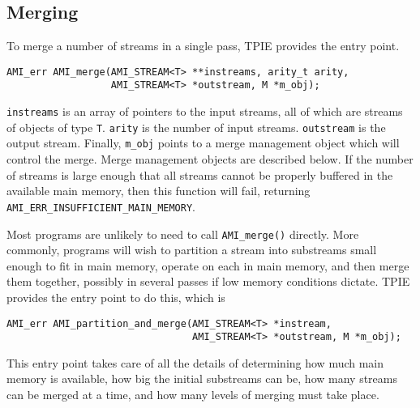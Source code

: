 \subsection{Merging}
\label{sec:ref-ami-merge}

To merge a number of streams in a single pass,
TPIE provides the entry point.

\begin{verbatim}
AMI_err AMI_merge(AMI_STREAM<T> **instreams, arity_t arity,
                  AMI_STREAM<T> *outstream, M *m_obj);
\end{verbatim}

\verb|instreams| is an array of pointers to the input streams, all of which
are streams of objects of type \verb|T|. \verb|arity| is the number of
input streams. \verb|outstream| is the output stream.  Finally,
\verb|m_obj| points to a merge management object which will control the
merge. Merge management objects are described below. If the number of
streams is large enough that all streams cannot be properly buffered in the
available main memory, then this function will fail, returning
\verb|AMI_ERR_INSUFFICIENT_MAIN_MEMORY|.

Most programs are unlikely to need to call \verb|AMI_merge()|
directly. More commonly, programs will wish to
partition a stream into substreams small enough to fit in main memory,
operate on each in main memory, and then merge them together, possibly in
several passes if low memory conditions dictate. TPIE provides the entry
point to do this, which is
\begin{verbatim}
AMI_err AMI_partition_and_merge(AMI_STREAM<T> *instream,
                                AMI_STREAM<T> *outstream, M *m_obj);
\end{verbatim}
This entry point takes care of all the details of determining how much
main memory is available, how big the initial substreams can be, how
many streams can be merged at a time, and how many levels of merging
must take place.

